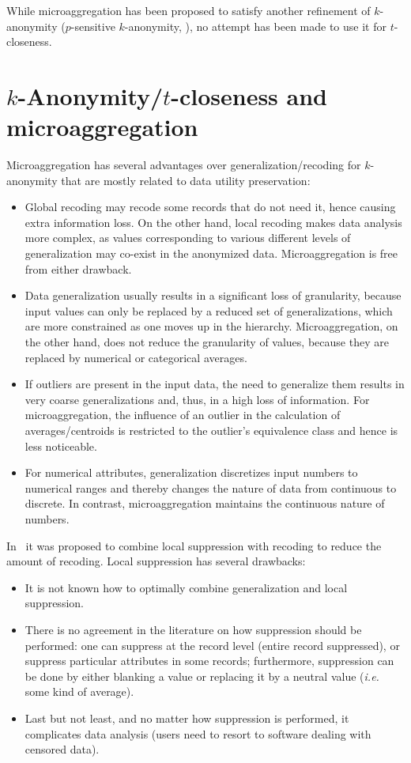 \documentclass[10pt,journal,compsoc]{IEEEtran}
\theoremstyle{definition}
\theoremstyle{plain}
\begin{document}
While microaggregation has been proposed to satisfy
another refinement of $k$-anonymity 
($p$-sensitive $k$-anonymity, \cite{Solanas2008microaggregation}),
no attempt has been made to use it for $t$-closeness.

\section{$k$-Anonymity/$t$-closeness and microaggregation}
\label{sec:comparison}





Microaggregation has several 
advantages over generalization/recoding for $k$-anonymity that are 
mostly related to data utility preservation:
\begin{itemize}
\item Global recoding may recode some records that
do not need it, hence causing extra information loss.
On the other hand, local recoding makes data analysis more
complex, as values corresponding to various different
levels of generalization may co-exist in the anonymized data.
Microaggregation is free from either drawback.
\item Data generalization usually results in a significant 
loss of granularity, because input values can only be replaced 
by a reduced set of generalizations, which 
are more constrained as one moves up in the hierarchy. 
Microaggregation, on the other hand,
does not reduce the granularity of values, because they are 
replaced by numerical or categorical averages.
\item If outliers are present in the input data, 
the need to generalize them
results in very coarse generalizations and, thus, in a high loss of information.
For microaggregation, the influence of an outlier in the 
calculation of averages/centroids
is restricted to the outlier's equivalence class and hence is less noticeable.
\item For numerical attributes, generalization discretizes 
input numbers to numerical ranges and thereby changes 
the nature of data from continuous to discrete.
In contrast, microaggregation 
maintains the continuous nature of numbers.
\end{itemize} 

In~\cite{Samarati1998Protecting,Sweeney2002kAnonymity} it was proposed
to combine local suppression with recoding to reduce
the amount of recoding. Local
suppression has several drawbacks:
\begin{itemize}
\item It is not known how to optimally combine generalization and 
local suppression.
\item There is no agreement in the literature on how suppression
should be performed:
one can suppress at the record level (entire record suppressed),
or suppress particular attributes in some records; furthermore, 
suppression can be done by either blanking a value or replacing it 
by a neutral value ({\em i.e.} some kind of average).
\item Last but not least, and no matter how suppression is performed,
it complicates data analysis (users need to resort to software
dealing with censored data).
\end{itemize}  
\end{document}
